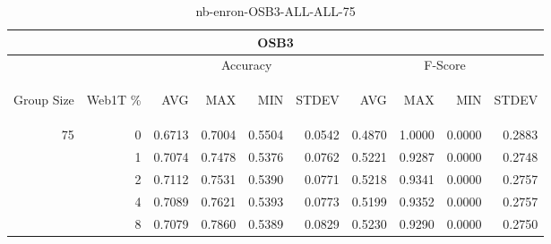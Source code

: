 \begin{center}
\begin{table}[htbp] 
 \begin{center}
\begin{tabular}{ | r | r | r | r | r | r | r | r | r | r |}
\hline
\multicolumn{10}{|c|}{OSB3}\\
\hline
 & & \multicolumn{4}{|c|}{Accuracy} & \multicolumn{4}{|c|}{F-Score}\\ \cline{3-10}
\begin{sideways}Group Size\end{sideways} & \begin{sideways}Web1T \%\end{sideways} & \begin{sideways}AVG\end{sideways} & \begin{sideways}MAX\end{sideways} & \begin{sideways}MIN\end{sideways} & \begin{sideways}STDEV\end{sideways} & \begin{sideways}AVG\end{sideways} & \begin{sideways}MAX\end{sideways} & \begin{sideways}MIN\end{sideways} & \begin{sideways}STDEV\end{sideways}\\
\hline
\multirow{4}{*}{75}
 & 0 & 0.6713 & 0.7004 & 0.5504 & 0.0542 & 0.4870 & 1.0000 & 0.0000 & 0.2883\\ \cline{2-10}
 & 1 & 0.7074 & 0.7478 & 0.5376 & 0.0762 & 0.5221 & 0.9287 & 0.0000 & 0.2748\\ \cline{2-10}
 & 2 & 0.7112 & 0.7531 & 0.5390 & 0.0771 & 0.5218 & 0.9341 & 0.0000 & 0.2757\\ \cline{2-10}
 & 4 & 0.7089 & 0.7621 & 0.5393 & 0.0773 & 0.5199 & 0.9352 & 0.0000 & 0.2757\\ \cline{2-10}
 & 8 & 0.7079 & 0.7860 & 0.5389 & 0.0829 & 0.5230 & 0.9290 & 0.0000 & 0.2750\\ \cline{2-10}
\hline
\end{tabular}
\caption{nb-enron-OSB3-ALL-ALL-75}
\label{table:nb-enron-OSB3-ALL-ALL-75}
\end{center}
 \end{table}
\end{center}

